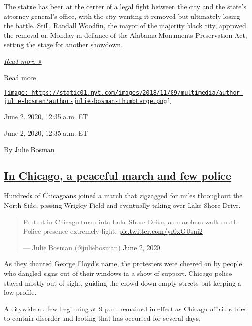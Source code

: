The statue has been at the center of a legal fight between the city and
the state's attorney general's office, with the city wanting it removed
but ultimately losing the battle. Still, Randall Woodfin, the mayor of
the majority black city, approved the removal on Monday in defiance of
the Alabama Monuments Preservation Act, setting the stage for another
showdown.

\href{https://www.nytimes.com/2020/06/02/us/george-floyd-birmingham-confederate-statue.html}{\emph{Read
more »}}

Read more

\href{https://www.nytimes.com/by/julie-bosman}{\texttt{[image: https://static01.nyt.com/images/2018/11/09/multimedia/author-julie-bosman/author-julie-bosman-thumbLarge.png]}}

June 2, 2020, 12:35 a.m. ET

June 2, 2020, 12:35 a.m. ET

By \href{https://www.nytimes.com/by/julie-bosman}{Julie Bosman}

\hypertarget{in-chicago-a-peaceful-march-and-few-police}{%
\subsection{\texorpdfstring{\protect\hyperlink{in-chicago-a-peaceful-march-and-few-police}{In
Chicago, a peaceful march and few
police}}{In Chicago, a peaceful march and few police}}\label{in-chicago-a-peaceful-march-and-few-police}}

Hundreds of Chicagoans joined a march that zigzagged for miles
throughout the North Side, passing Wrigley Field and eventually taking
over Lake Shore Drive.

\begin{quote}
Protest in Chicago turns into Lake Shore Drive, as marchers walk south.
Police presence extremely light.
\href{https://t.co/yr0xGUsni2}{pic.twitter.com/yr0xGUsni2}

--- Julie Bosman (@juliebosman)
\href{https://twitter.com/juliebosman/status/1267642028466339841?ref_src=twsrc\%5Etfw}{June
2, 2020}
\end{quote}

As they chanted George Floyd's name, the protesters were cheered on by
people who dangled signs out of their windows in a show of support.
Chicago police stayed mostly out of sight, guiding the crowd down empty
streets but keeping a low profile.

A citywide curfew beginning at 9 p.m. remained in effect as Chicago
officials tried to contain disorder and looting that has occurred for
several days.

